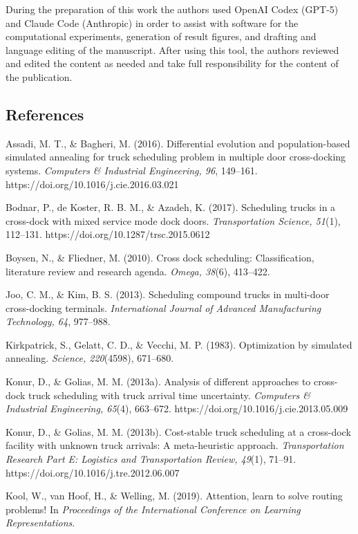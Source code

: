 \documentclass[
]{article}
\begin{document}
During the preparation of this work the authors used OpenAI Codex
(GPT-5) and Claude Code (Anthropic) in order to assist with software for
the computational experiments, generation of result figures, and
drafting and language editing of the manuscript. After using this tool,
the authors reviewed and edited the content as needed and take full
responsibility for the content of the publication.

\subsection{References}\label{references}

Assadi, M. T., \& Bagheri, M. (2016). Differential evolution and
population-based simulated annealing for truck scheduling problem in
multiple door cross-docking systems. \emph{Computers \& Industrial
Engineering, 96}, 149--161. https://doi.org/10.1016/j.cie.2016.03.021

Bodnar, P., de Koster, R. B. M., \& Azadeh, K. (2017). Scheduling trucks
in a cross-dock with mixed service mode dock doors. \emph{Transportation
Science, 51}(1), 112--131. https://doi.org/10.1287/trsc.2015.0612

Boysen, N., \& Fliedner, M. (2010). Cross dock scheduling:
Classification, literature review and research agenda. \emph{Omega,
38}(6), 413--422.

Joo, C. M., \& Kim, B. S. (2013). Scheduling compound trucks in
multi-door cross-docking terminals. \emph{International Journal of
Advanced Manufacturing Technology, 64}, 977--988.

Kirkpatrick, S., Gelatt, C. D., \& Vecchi, M. P. (1983). Optimization by
simulated annealing. \emph{Science, 220}(4598), 671--680.

Konur, D., \& Golias, M. M. (2013a). Analysis of different approaches to
cross-dock truck scheduling with truck arrival time uncertainty.
\emph{Computers \& Industrial Engineering, 65}(4), 663--672.
https://doi.org/10.1016/j.cie.2013.05.009

Konur, D., \& Golias, M. M. (2013b). Cost-stable truck scheduling at a
cross-dock facility with unknown truck arrivals: A meta-heuristic
approach. \emph{Transportation Research Part E: Logistics and
Transportation Review, 49}(1), 71--91.
https://doi.org/10.1016/j.tre.2012.06.007

Kool, W., van Hoof, H., \& Welling, M. (2019). Attention, learn to solve
routing problems! In \emph{Proceedings of the International Conference
on Learning Representations}.
\end{document}

